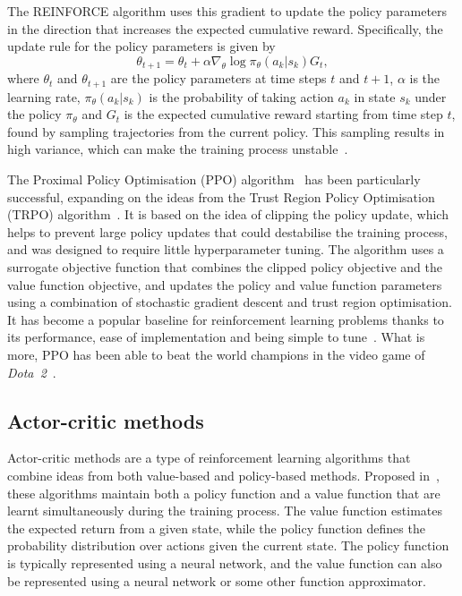 The REINFORCE algorithm uses this gradient to update the policy parameters in the direction that increases the expected cumulative reward. Specifically, the update rule for the policy parameters is given by
\begin{equation}
    \theta_{t+1} = \theta_t + \alpha \nabla_{\theta} \log \pi_{\theta}(a_k|s_k) G_t,
\end{equation}
where $\theta_t$ and $\theta_{t+1}$ are the policy parameters at time steps $t$ and $t+1$, $\alpha$ is the learning rate, $\pi_{\theta}(a_k|s_k)$ is the probability of taking action $a_k$ in state $s_k$ under the policy $\pi_{\theta}$ and $G_t$ is the expected cumulative reward starting from time step $t$, found by sampling trajectories from the current policy.
This sampling results in high variance, which can make the training process unstable~\autocite{arulkumaran2017}.

The Proximal Policy Optimisation (PPO) algorithm~\autocite{schulman2017} has been particularly successful, expanding on the ideas from the Trust Region Policy Optimisation (TRPO) algorithm~\autocite{schulman2015}.
It is based on the idea of clipping the policy update, which helps to prevent large policy updates that could destabilise the training process, and was designed to require little hyperparameter tuning.
The algorithm uses a surrogate objective function that combines the clipped policy objective and the value function objective, and updates the policy and value function parameters using a combination of stochastic gradient descent and trust region optimisation.
It has become a popular baseline for reinforcement learning problems thanks to its performance, ease of implementation and being simple to tune~\autocite{schulman2017}.
What is more, PPO has been able to beat the world champions in the video game of \textit{Dota~2}~\autocite{brockman2018,openai2019}.

\subsection{Actor-critic methods}
Actor-critic methods are a type of reinforcement learning algorithms that combine ideas from both value-based and policy-based methods.
Proposed in~\autocite{konda1999}, these algorithms maintain both a policy function and a value function that are learnt simultaneously during the training process.
The value function estimates the expected return from a given state, while the policy function defines the probability distribution over actions given the current state.
The policy function is typically represented using a neural network, and the value function can also be represented using a neural network or some other function approximator.

